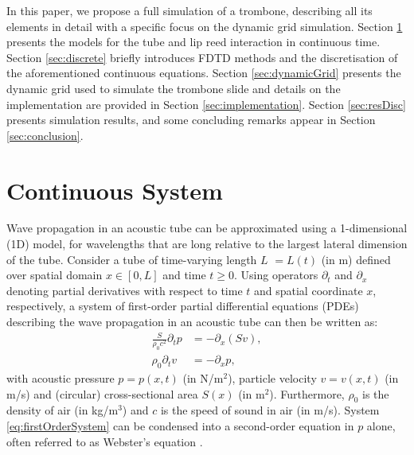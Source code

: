 In this paper, we propose a full simulation of a trombone, describing all its elements in detail with a specific focus on the dynamic grid simulation. Section \ref{sec:continuous} presents the models for the tube and lip reed interaction in continuous time. Section \ref{sec:discrete} briefly introduces FDTD methods and the discretisation of the aforementioned continuous equations. Section \ref{sec:dynamicGrid} presents the dynamic grid used to simulate the trombone slide and details on the implementation are provided in Section \ref{sec:implementation}. Section \ref{sec:resDisc} presents simulation results, and some concluding remarks appear in Section \ref{sec:conclusion}.

\section{Continuous System}\label{sec:continuous}
Wave propagation in an acoustic tube can be approximated using a 1-dimensional (1D) model, for wavelengths that are long relative to the largest lateral dimension of the tube. Consider a tube of time-varying length $L$ $=L(t)$ (in m) defined over spatial domain $x\in [0, L]$ and time $t\geq 0$. Using operators $\partial_t$ and $\partial_x$ denoting partial derivatives with respect to time $t$ and spatial coordinate $x$, respectively, a system of first-order partial differential equations (PDEs) describing the wave propagation in an acoustic tube can then be written as:
\begin{subequations}\label{eq:firstOrderSystem}
    \begin{align}
        \frac{S}{\rho_0 c^2}\partial_t p &= -\partial_x(Sv),\label{eq:contPressure}\\
        \rho_0\partial_tv &= -\partial_xp,\label{eq:contVelocity}
    \end{align}
\end{subequations}
with acoustic pressure $p = p(x,t)$ (in N/m$^2$), particle velocity $v = v(x,t)$ (in m/s) and (circular) cross-sectional area $S(x)$ (in m$^2$). Furthermore, $\rho_0$ is the density of air (in kg/m$^3$) and $c$ is the speed of sound in air (in m/s). System \eqref{eq:firstOrderSystem} can be condensed into a second-order equation in $p$ alone, often referred to as Webster's equation \cite{Webster19}.  %
